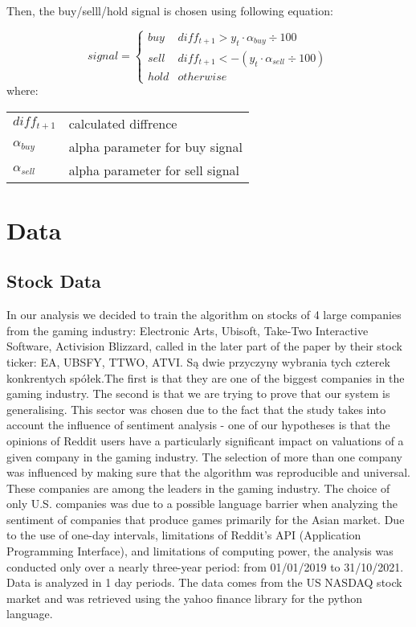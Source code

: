 \documentclass[11pt]{article} %
\makeatletter
\newenvironment{conditions}
  {\par\vspace{\abovedisplayskip}\noindent\begin{tabular}{>{$}l<{$} @{${}={}$} l}}
  {\end{tabular}\par\vspace{\belowdisplayskip}}
\makeatother
\begin{document}
 \begin{flushleft} Then, the buy/selll/hold signal is chosen using following equation: \end{flushleft} 
\begin{equation}
signal =  \left\{\begin{array}{ll} buy & diff_{t+1} >  y_{t} \cdot  \alpha_{buy} \div 100 \\ sell & diff_{t+1} <  -(y_{t} \cdot  \alpha_{sell} \div 100)\\  hold & otherwise \end{array}\right.
\end{equation}
where:
\begin{conditions}
diff_{t+1} & calculated diffrence \\ 
\alpha_{buy}     &  alpha parameter for buy signal \\   
\alpha_{sell}     &  alpha parameter for sell signal\\   
\end{conditions}

\section{Data}
\subsection{Stock Data}
In our analysis we decided to train the algorithm on stocks of 4 large companies from the gaming industry: Electronic Arts, Ubisoft, Take-Two Interactive Software, Activision Blizzard, called in the later part of the paper by their stock ticker: EA, UBSFY, TTWO, ATVI. Są dwie przyczyny wybrania tych czterek konkrentych spółek.The first is that they are one of the biggest companies in the gaming industry. The second is that we are trying to prove that our system is generalising. This sector was chosen due to the fact that the study takes into account the influence of sentiment analysis - one of our hypotheses is that the opinions of Reddit users have a particularly significant impact on valuations of a given company in the gaming industry.  The selection of more than one company was influenced by making sure that the algorithm was reproducible and universal. These companies are among the leaders in the gaming industry. The choice of only U.S. companies was due to a possible language barrier when analyzing the sentiment of companies that produce games primarily for the Asian market. Due to the use of one-day intervals, limitations of Reddit's API (Application Programming Interface), and limitations of computing power, the analysis was conducted only over a nearly three-year period: from 01/01/2019 to 31/10/2021. Data is analyzed in 1 day periods. The data comes from the US NASDAQ stock market and was retrieved using the yahoo finance library for the python language. 
\end{document}
